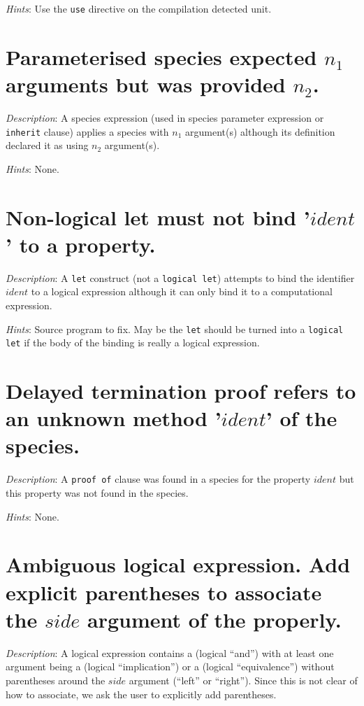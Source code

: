 {\em Hints}: Use the {\tt use} directive on the compilation detected
unit.



\section*{Parameterised species  expected $n_1$ arguments but
  was provided $n_2$.}
{\em Description}: A species expression (used in species parameter
expression or {\tt inherit} clause) applies a species with $n_1$
argument(s) although its definition declared it as using $n_2$
argument(s).

{\em Hints}: None.



\section*{Non-logical let must not bind '$ident$' to a property.}
{\em Description}: A {\tt let} construct (not a {\tt logical let})
attempts to bind the identifier $ident$ to a logical expression
although it can only bind it to a computational expression.

{\em Hints}: Source program to fix. May be the {\tt let} should be
turned into a {\tt logical let} if the body of the binding is really a
logical expression.



\section*{Delayed termination proof refers to an unknown method
  '$ident$' of the species.}
{\em Description}: A {\tt proof of} clause was found in a species for
the property $ident$ but this property was not found in the species.

{\em Hints}: None.



\section*{Ambiguous logical expression. Add explicit parentheses to
  associate the $side$ argument of the \terminal{/\backslash} properly.}
{\em Description}: A logical expression contains a
\terminal{/\backslash} (logical ``and'') with at least one argument being a
\terminal{->} (logical ``implication'') or a \terminal{<->} (logical
``equivalence'') without parentheses around the $side$ argument (``left''
or ``right''). Since this is not clear of how to associate, we  ask
the user to explicitly add parentheses.

